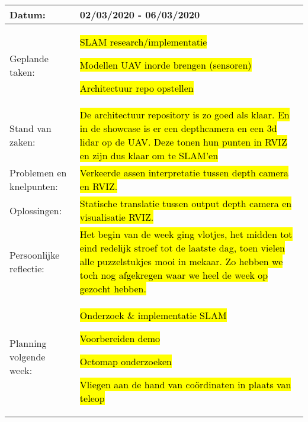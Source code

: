 \begin{tabularx}{\textwidth}{| l | X |}
  \hline
  Datum: & 02/03/2020 - 06/03/2020\\
  \hline
  Geplande taken: &
  \begin{compactitem}
    \item \hl{SLAM research/implementatie}
    \item \hl{Modellen UAV inorde brengen (sensoren)}
    \item \hl{Architectuur repo opstellen}
  \end{compactitem}\\
  \hline
  Stand van zaken: & \hl{De architectuur repository is zo goed als klaar. En in de showcase is er een depthcamera en een 3d lidar op de UAV. Deze tonen hun punten in RVIZ en zijn dus klaar om te SLAM'en}\\
  \hline
  Problemen en knelpunten: & \hl{Verkeerde assen interpretatie tussen depth camera en RVIZ.}\\
  \hline
  Oplossingen: & \hl{Statische translatie tussen output depth camera en visualisatie RVIZ.}\\
  \hline
  Persoonlijke reflectie: & \hl{Het begin van de week ging vlotjes, het midden tot eind redelijk stroef tot de laatste dag, toen vielen alle puzzelstukjes mooi in mekaar. Zo hebben we toch nog afgekregen waar we heel de week op gezocht hebben.}\\
  \hline
  Planning volgende week: &
  \begin{compactitem}
    \item \hl{Onderzoek \& implementatie SLAM}
    \item \hl{Voorbereiden demo}
    \item \hl{Octomap onderzoeken}
    \item \hl{Vliegen aan de hand van co\"ordinaten in plaats van teleop}
  \end{compactitem}\\
  \hline
\end{tabularx}